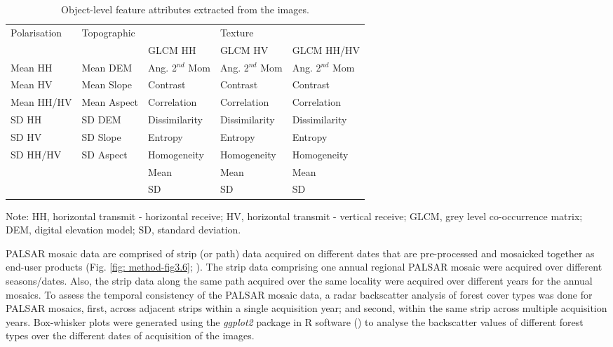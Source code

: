 \begin{spacing}{1.0}
\begin{longtable}[h!]{ p{2.6cm} p{2.6cm} p{2.6cm} p{2.6cm} p{2.6cm} }

    \caption[Object-level feature attributes extracted from the images.]{Object-level feature attributes extracted from the images.}
    \label{tab: method-table3.2}\\
    
    	\toprule
    	Polarisation & Topographic & {} & Texture & {}\\
    	\cmidrule{3-5}
    	{} & {} & GLCM HH & GLCM HV & GLCM HH/HV\\
    	\midrule
    	\endhead
    	
		Mean HH & Mean DEM & Ang. 2$^{nd}$ Mom & Ang. 2$^{nd}$ Mom & Ang. 2$^{nd}$ Mom\\
		Mean HV & Mean Slope & Contrast & Contrast & Contrast\\
		Mean HH/HV & Mean Aspect & Correlation & Correlation & Correlation\\
		SD HH & SD DEM & Dissimilarity & Dissimilarity & Dissimilarity\\
		SD HV & SD Slope & Entropy & Entropy & Entropy\\
		SD HH/HV & SD Aspect & Homogeneity & Homogeneity & Homogeneity\\
		{} & {} & Mean & Mean & Mean\\
		{} & {} & SD & SD & SD\\
		
		\bottomrule
    
\end{longtable}

	\noindent Note: HH, horizontal transmit - horizontal receive; HV, horizontal transmit - vertical receive; GLCM, grey level co-occurrence matrix; DEM, digital elevation model; SD, standard deviation.\\ \newline

\end{spacing}

PALSAR mosaic data are comprised of strip (or path) data acquired on different dates that are pre-processed and mosaicked together as end-user products (Fig. \ref{fig: method-fig3.6}; \cite{shimada_generating_2010}). The strip data comprising one annual regional PALSAR mosaic were acquired over different seasons/dates. Also, the strip data along the same path acquired over the same locality were acquired over different years for the annual mosaics. To assess the temporal consistency of the PALSAR mosaic data, a radar backscatter analysis of forest cover types was done for PALSAR mosaics, first, across adjacent strips within a single acquisition year; and second, within the same strip across multiple acquisition years. Box-whisker plots were generated using the \textit{ggplot2} package in R software (\cite{wickham_ggplot2:_2015}) to analyse the backscatter values of different forest types over the different dates of acquisition of the images.\\

